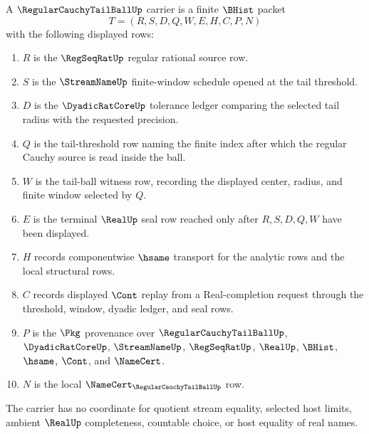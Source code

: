 \begin{definition}
\label{def:regular-cauchy-tail-ball-carrier}
A $\RegularCauchyTailBallUp$ carrier is a finite $\BHist$ packet
$$
T=(R,S,D,Q,W,E,H,C,P,N)
$$
with the following displayed rows:
\begin{enumerate}
\item $R$ is the $\RegSeqRatUp$ regular rational source row.
\item $S$ is the $\StreamNameUp$ finite-window schedule opened at the tail threshold.
\item $D$ is the $\DyadicRatCoreUp$ tolerance ledger comparing the selected tail radius with the requested precision.
\item $Q$ is the tail-threshold row naming the finite index after which the regular Cauchy source is read inside the ball.
\item $W$ is the tail-ball witness row, recording the displayed center, radius, and finite window selected by $Q$.
\item $E$ is the terminal $\RealUp$ seal row reached only after $R,S,D,Q,W$ have been displayed.
\item $H$ records componentwise $\hsame$ transport for the analytic rows and the local structural rows.
\item $C$ records displayed $\Cont$ replay from a Real-completion request through the threshold, window, dyadic ledger, and seal rows.
\item $P$ is the $\Pkg$ provenance over $\RegularCauchyTailBallUp$, $\DyadicRatCoreUp$, $\StreamNameUp$, $\RegSeqRatUp$, $\RealUp$, $\BHist$, $\hsame$, $\Cont$, and $\NameCert$.
\item $N$ is the local $\NameCert_{\RegularCauchyTailBallUp}$ row.
\end{enumerate}
The carrier has no coordinate for quotient stream equality, selected host limits, ambient $\RealUp$ completeness, countable choice, or host equality of real names.
\end{definition}

